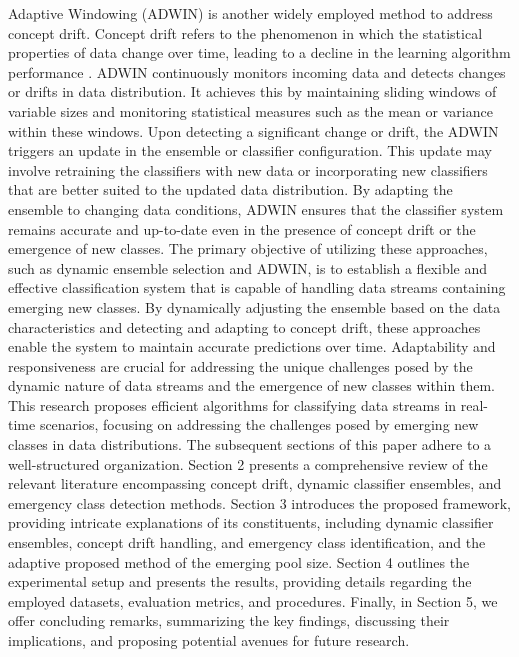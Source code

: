    Adaptive Windowing (ADWIN) is another widely employed method to address concept drift. Concept drift refers to the phenomenon in which the statistical properties of data change over time, leading to a decline in the learning algorithm performance \cite{gama2004learning}\cite{adams2023explainable}\cite{madkour2023historical}. ADWIN continuously monitors incoming data and detects changes or drifts in data distribution. It achieves this by maintaining sliding windows of variable sizes and monitoring statistical measures such as the mean or variance within these windows. Upon detecting a significant change or drift, the ADWIN triggers an update in the ensemble or classifier configuration. This update may involve retraining the classifiers with new data or incorporating new classifiers that are better suited to the updated data distribution. By adapting the ensemble to changing data conditions, ADWIN ensures that the classifier system remains accurate and up-to-date even in the presence of concept drift or the emergence of new classes. The primary objective of utilizing these approaches, such as dynamic ensemble selection and ADWIN, is to establish a flexible and effective classification system that is capable of handling data streams containing emerging new classes. By dynamically adjusting the ensemble based on the data characteristics and detecting and adapting to concept drift, these approaches enable the system to maintain accurate predictions over time. Adaptability and responsiveness are crucial for addressing the unique challenges posed by the dynamic nature of data streams and the emergence of new classes within them.  
  This research proposes efficient algorithms for classifying data streams in real-time scenarios, focusing on addressing the challenges posed by emerging new classes in data distributions. 
  The subsequent sections of this paper adhere to a well-structured organization. Section 2 presents a comprehensive review of the relevant literature encompassing concept drift, dynamic classifier ensembles, and emergency class detection methods. Section 3 introduces the proposed framework, providing intricate explanations of its constituents, including dynamic classifier ensembles, concept drift handling, and emergency class identification, and the adaptive proposed method of the emerging pool size. Section 4 outlines the experimental setup and presents the results, providing details regarding the employed datasets, evaluation metrics, and procedures. Finally, in Section 5, we offer concluding remarks, summarizing the key findings, discussing their implications, and proposing potential avenues for future research.
  
